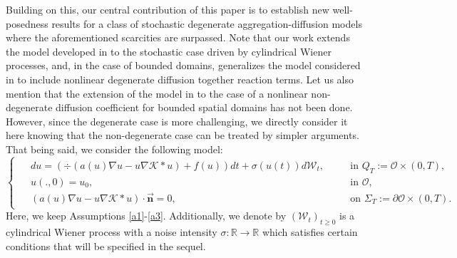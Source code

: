 \documentclass[10pt,number,preprint,times]{elsarticle}
\numberwithin{equation}{section} %
\begin{document}
Building on this, our central contribution of this paper is to establish new well-posedness results for a class of stochastic degenerate aggregation-diffusion models where the aforementioned scarcities are surpassed.
Note that our work extends the model developed in \cite{bendahmane2023optimal} to the stochastic case driven by cylindrical Wiener processes, and, in the case of bounded domains, generalizes the model considered in \cite{tang2024strong} to include nonlinear degenerate diffusion together reaction terms. Let us also mention that the extension of the model in \cite{tang2024strong} to the case of a nonlinear non-degenerate diffusion coefficient for bounded spatial domains has not been done. However, since the degenerate case is more challenging, we directly consider it here knowing that the non-degenerate case can be treated by simpler arguments. That being said, we consider the following model:
\begin{equation}\label{basicstoch}
	\begin{cases}
		\begin{split}
			&du=\left(\div\left(a(u) \nabla u-u \nabla \mathcal{K} \ast u\right) +f(u)\right)dt+\sigma(u(t))d\mathcal{W}_t, &&\quad \text{in } Q_T:=\mathcal{O} \times (0,T),\\
			&u(.,0)=u_0,  &&\quad \text{in } \mathcal{O},\\
			&\left(a(u)\nabla u-u \nabla \mathcal{K} \ast u\right) \cdot \overrightarrow{\textbf{n}}=0, \;\; &&\quad \text{on } \Sigma_T:=\partial \mathcal{O} \times (0,T).
		\end{split}
	\end{cases}
\end{equation}
Here, we keep Assumptions \ref{a1}-\ref{a3}. Additionally, we denote by $\left(\mathcal{W}_t\right)_{t \geq 0}$ is a cylindrical Wiener process with a noise intensity $\sigma : \mathbb{R} \longrightarrow \mathbb{R}$ which satisfies certain conditions that will be specified in the sequel.
\end{document}
